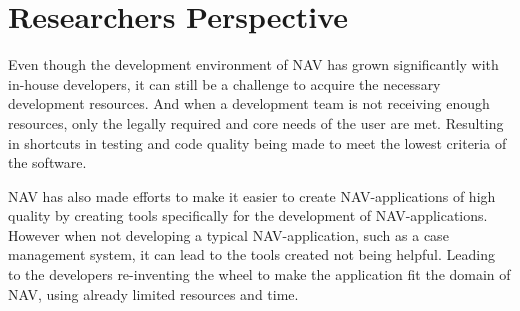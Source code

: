 



\section{Researchers Perspective}
Even though the development environment of NAV has grown significantly with in-house developers, it can still be a challenge to acquire the necessary development resources. And when a development team is not receiving enough resources, only the legally required and core needs of the user are met. Resulting in shortcuts in testing and code quality being made to meet the lowest criteria of the software.

NAV has also made efforts to make it easier to create NAV-applications of high quality by creating tools specifically for the development of NAV-applications. However when not developing a typical NAV-application, such as a case management system, it can lead to the tools created not being helpful. Leading to the developers re-inventing the wheel to make the application fit the domain of NAV, using already limited resources and time.

